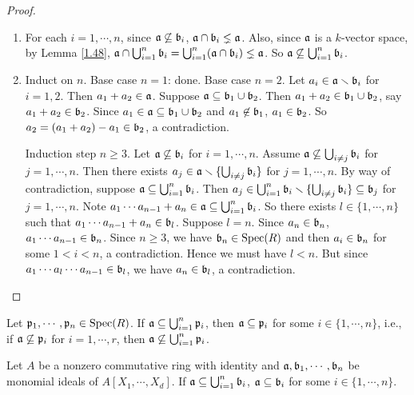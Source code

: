 \begin{proof}
    \begin{enumerate}
        \item For each $i = 1,\cdots,n$, since $\mathfrak{a} \not \subseteq \mathfrak{b}_i$, $\mathfrak{a} \cap \mathfrak{b}_i \lneq \mathfrak{a}$. Also, since $\mathfrak{a}$ is a $k$-vector space, by Lemma \ref{1.48}, $\mathfrak{a} \cap \bigcup_{i=1}^n \mathfrak{b}_i = \bigcup_{i=1}^n (\mathfrak{a} \cap \mathfrak{b}_i) \lneq \mathfrak{a}$. So $\mathfrak{a} \not \subseteq \bigcup_{i=1}^n \mathfrak{b}_i$. 
        \item Induct on $n$. Base case $n = 1$: done. Base case $n = 2$. Let $a_i \in \mathfrak{a} \smallsetminus \mathfrak{b}_i$ for $i = 1,2$. Then $a_1 + a_2 \in \mathfrak{a}$. Suppose $\mathfrak{a} \subseteq \mathfrak{b}_1 \cup \mathfrak{b}_2$. Then $a_1 + a_2 \in \mathfrak{b}_1 \cup \mathfrak{b}_2$, say $a_1 + a_2 \in \mathfrak{b}_2$. Since $a_1 \in \mathfrak{a} \subseteq \mathfrak{b}_1 \cup \mathfrak{b}_2$ and $a_1 \not \in \mathfrak{b}_1$, $a_1 \in \mathfrak{b}_2$. So $a_2 = (a_1 + a_2) - a_1 \in \mathfrak{b}_2$, a contradiction. \par 
            Induction step $n \geq 3$. Let $\mathfrak{a} \not \subseteq \mathfrak{b}_i$ for $i = 1,\cdots,n$. Assume $\mathfrak{a} \not \subseteq \bigcup_{i \neq j} \mathfrak{b}_i$ for $j = 1,\cdots,n$. Then there exists $a_j \in \mathfrak{a} \smallsetminus \{\bigcup_{i \neq j} \mathfrak{b}_i\}$ for $j = 1,\cdots,n$. By way of contradiction, suppose $\mathfrak{a} \subseteq \bigcup_{i=1}^n \mathfrak{b}_i$. Then $a_j \in \bigcup_{i=1}^n \mathfrak{b}_i \smallsetminus \{\bigcup_{i \neq j}\mathfrak{b}_i\} \subseteq \mathfrak{b}_j$ for $j = 1,\cdots,n$. Note $a_1 \cdots a_{n-1} + a_n \in \mathfrak{a} \subseteq \bigcup_{i=1}^n \mathfrak{b}_i$. So there exists $l \in \{1,\cdots,n\}$ such that $a_1 \cdots a_{n-1} + a_n \in \mathfrak{b}_l$. Suppose $l=n$. Since $a_n \in \mathfrak{b}_n$, $a_1 \cdots a_{n-1} \in \mathfrak{b}_n$. Since $n \geq 3$, we have $\mathfrak{b}_n \in \operatorname{Spec}(R)$ and then $a_i \in \mathfrak{b}_n$ for some $1 < i < n$, a contradiction. Hence we must have $l < n$. But since $a_1 \cdots a_l \cdots a_{n-1} \in \mathfrak{b}_l$, we have $a_n \in \mathfrak{b}_l$, a contradiction. \qedhere
    \end{enumerate}
\end{proof}

\begin{theorem}\label{1.51}
    Let $\mathfrak{p}_1,\cdots,\mathfrak{p}_n \in \operatorname{Spec}(R)$. If $\mathfrak{a} \subseteq \bigcup_{i=1}^n \mathfrak{p}_i$, then $\mathfrak{a} \subseteq \mathfrak{p}_i$ for some $i \in \{1,\cdots,n\}$, i.e., if $\mathfrak{a} \not \subseteq \mathfrak{p}_i$ for $i = 1,\cdots,r$, then $\mathfrak{a} \not \subseteq \bigcup_{i=1}^n \mathfrak{p}_i$.
\end{theorem}

\begin{fact*} 
    Let $A$ be a nonzero commutative ring with identity and $\mathfrak{a},\mathfrak{b}_1,\cdots,\mathfrak{b}_n$ be monomial ideals of $A[X_1,\cdots,X_d]$. If $\mathfrak{a} \subseteq \bigcup_{i=1}^n \mathfrak{b}_i$, $\mathfrak{a} \subseteq \mathfrak{b}_i$ for some $i \in \{1,\cdots,n\}$.
\end{fact*}

